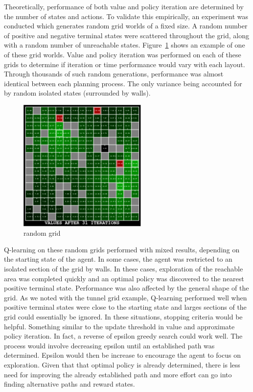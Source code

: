 \documentclass{sig-alternate}
\begin{document}
Theoretically, performance of both value and policy iteration are determined by the number of states and actions. To validate this empirically, an experiment was conducted which generates random grid worlds of a fixed size. A random number of positive and negative terminal states were scattered throughout the grid, along with a random number of unreachable states. Figure~\ref{random} shows an example of one of these grid worlds. Value and policy iteration was performed on each of these grids to determine if iteration or time performance would vary with each layout. Through thousands of such random generations, performance was almost identical between each planning process. The only variance being accounted for by random isolated states (surrounded by walls).

\begin{figure}[!htbp]
    \centering
    \includegraphics[width=2.5in]{images/random.pdf}
    \caption{random grid \label{random}}
\end{figure} 

Q-learning on these random grids performed with mixed results, depending on the starting state of the agent. In some cases, the agent was restricted to an isolated section of the grid by walls. In these cases, exploration of the reachable area was completed quickly and an optimal policy was discovered to the nearest positive terminal state. Performance was also affected by the general shape of the grid. As we noted with the tunnel grid example, Q-learning performed well when positive terminal states were close to the starting state and larges sections of the grid could essentially be ignored. In these situations, stopping criteria would be helpful. Something similar to the update threshold in value and approximate policy iteration. In fact, a reverse of epsilon greedy search could work well. The process would involve decreasing epsilon until an established path was determined. Epsilon would then be increase to encourage the agent to focus on exploration. Given that that optimal policy is already determined, there is less need for improving the already established path and more effort can go into finding alternative paths and reward states.




\end{document}
